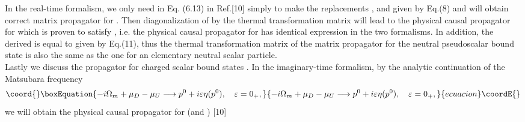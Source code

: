 \documentclass[twocolumn,prd,showpacs,a4paper]{revtex4}
\begin{document}
In the real-time formalism, we only need in Eq. (6.13) in Ref.[10] simply 
to make the replacements \coordHE{}, \coordHE{} and \coordHE{} 
given by Eq.(8) and will obtain correct matrix propagator \coordHE{} for \coordHE{}. Then diagonalization of \coordHE{} by the thermal transformation matrix \coordHE{} will lead to the physical causal 
propagator \coordHE{} for \coordHE{} which is proven to satisfy 
\coordHE{}, i.e. the physical causal 
propagator for \coordHE{} has identical expression in the two formalisms. In 
addition, the derived \coordHE{} is equal to \coordHE{} given by Eq.(11), thus the thermal 
transformation matrix of the matrix propagator for the neutral pseudoscalar bound 
state \coordHE{} is also the same as the one for an elementary neutral scalar 
particle.\\
\indent Lastly we discuss the propagator for charged scalar bound states \myHighlight{$\phi^{\mp}$}\coordHE{}.  In the imaginary-time formalism, by the analytic continuation of the Matsubara 
frequency 
\coordHE{}
\begin{equation}\coord{}\boxEquation{
-i\Omega_m +\mu_D-\mu_U\longrightarrow p^0 +i\varepsilon \eta(p^0), \ \ \
                     \varepsilon =0_+,
}{
-i\Omega_m +\mu_D-\mu_U\longrightarrow p^0 +i\varepsilon \eta(p^0), \ \ \
                     \varepsilon =0_+,
}{ecuacion}\coordE{}\end{equation}%
we will obtain the physical causal propagator for \myHighlight{$\phi^-$}\coordHE{} (and \myHighlight{$\phi^+$}\coordHE{}) [10]
\end{document}
